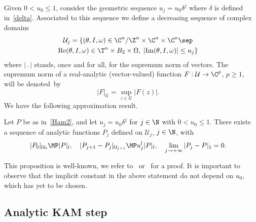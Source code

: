Given $0< u_0 \leq 1$, consider the geometric sequence $u_j=u_0\delta^{j}$ where $\delta$ is defined in~\eqref{delta}. Associated to this sequence we define a decreasing sequence of complex domains
\begin{multline}\label{complexdom}
\mathcal{U}_j= \{(\theta,I,\omega) \in \C^n/\Z^n \times \C^n \times \C^n \sep\\
\mathrm{Re}(\theta,I,\omega) \in \T^n \times B_2 \times \Omega, \; |\mathrm{Im}(\theta,I,\omega)| \leq u_j
\}
\end{multline}
where $|\,.\,|$ stands, once and for all, for the supremum norm of vectors. The supremum norm of a real-analytic (vector-valued) function $F : \mathcal{U} \to \C^p$, $p \geq 1$, will be denoted~by
\[ |F|_{\mathcal{U}}=\sup_{z \in \mathcal{U}} |F(z)|. \]
We have the following approximation result.

\begin{proposition}\label{smoothing}
Let $P$ be as in~\eqref{Ham2}, and let $u_j=u_0\delta^{j}$ for $j \in \N$ with $0< u_0 \leq 1$. There exists a sequence of analytic functions $P_j$ defined on $\mathcal{U}_j$, $j \in \N$, with
\[ |P_0|_{\mathcal{U}_0} \MP |P|_l, \quad |P_{j+1}-P_{j}|_{\mathcal{U}_{j+1}} \MP u_{j}^l|P|_l, \quad \lim_{j \to +\infty}|P_j-P|_1=0. \]
\end{proposition}

This proposition is well-known, we refer to~\cite{Zeh75} or~\cite{Sal04} for a proof. It is important to observe that the implicit constant in the above statement do not depend on $u_0$, which has yet to be chosen.

\subsection{Analytic KAM step}

